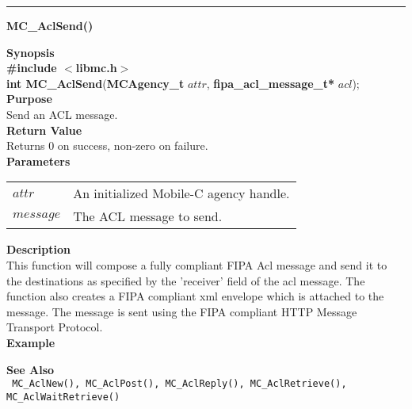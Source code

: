 \noindent
\vspace{5pt}
\rule{6.5in}{0.015in}
\noindent
{}
{\LARGE \bf MC\_AclSend()}\\
\label{api:MC\_AclSend()}

\noindent
{\bf Synopsis}\\
{\bf \#include $<$libmc.h$>$}\\
{\bf int MC\_AclSend}({\bf MCAgency\_t} $attr$, {\bf fipa\_acl\_message\_t*} $acl$);\\

\noindent
{\bf Purpose}\\
Send an ACL message.\\

\noindent
{\bf Return Value}\\
Returns 0 on success, non-zero on failure.\\

\noindent
{\bf Parameters}
\vspace{-0.1in}
\begin{description}
\item
\begin{tabular}{p{10 mm}p{145 mm}} 
$attr$ & An initialized Mobile-C agency handle.\\
$message$ & The ACL message to send. 
\end{tabular}
\end{description}

\noindent
{\bf Description}\\
This function will compose a fully compliant FIPA Acl message
and send it to the destinations as specified by the 'receiver' field of
the acl message. The function also creates a FIPA compliant
xml envelope which is attached to the message. The message is sent
using the FIPA compliant HTTP Message Transport Protocol.\\

\noindent
{\bf Example}\\
\noindent
{\footnotesize}

\noindent
{\bf See Also}\\
\texttt{
  MC\_AclNew(), MC\_AclPost(), MC\_AclReply(), MC\_AclRetrieve(), 
    \linebreak MC\_AclWaitRetrieve()
}

